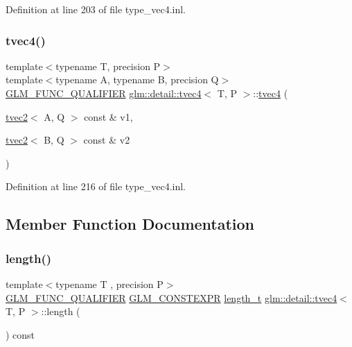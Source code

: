 Definition at line 203 of file type\+\_\+vec4.\+inl.

\mbox{\label{structglm_1_1detail_1_1tvec4_a5ae1182faaf5b3409da227032738f74a}} 
\subsubsection{\texorpdfstring{tvec4()}{tvec4()}\hspace{0.1cm}{\footnotesize\ttfamily [23/23]}}
{\footnotesize\ttfamily template$<$typename T, precision P$>$ \\
template$<$typename A, typename B, precision Q$>$ \\
\hyperlink{setup_8hpp_a33fdea6f91c5f834105f7415e2a64407}{G\+L\+M\+\_\+\+F\+U\+N\+C\+\_\+\+Q\+U\+A\+L\+I\+F\+I\+ER} \hyperlink{structglm_1_1detail_1_1tvec4}{glm\+::detail\+::tvec4}$<$ T, P $>$\+::\hyperlink{structglm_1_1detail_1_1tvec4}{tvec4} (\begin{DoxyParamCaption}\item[{\hyperlink{structglm_1_1detail_1_1tvec2}{tvec2}$<$ A, Q $>$ const \&}]{v1,  }\item[{\hyperlink{structglm_1_1detail_1_1tvec2}{tvec2}$<$ B, Q $>$ const \&}]{v2 }\end{DoxyParamCaption})}



Definition at line 216 of file type\+\_\+vec4.\+inl.



\subsection{Member Function Documentation}
\mbox{\label{structglm_1_1detail_1_1tvec4_a7a59e6b09b1a2262085cb30cb94eacfc}} 
\subsubsection{\texorpdfstring{length()}{length()}}
{\footnotesize\ttfamily template$<$typename T , precision P$>$ \\
\hyperlink{setup_8hpp_a33fdea6f91c5f834105f7415e2a64407}{G\+L\+M\+\_\+\+F\+U\+N\+C\+\_\+\+Q\+U\+A\+L\+I\+F\+I\+ER} \hyperlink{setup_8hpp_a08b807947b47031d3a511f03f89645ad}{G\+L\+M\+\_\+\+C\+O\+N\+S\+T\+E\+X\+PR} \hyperlink{namespaceglm_a090a0de2260835bee80e71a702492ed9}{length\+\_\+t} \hyperlink{structglm_1_1detail_1_1tvec4}{glm\+::detail\+::tvec4}$<$ T, P $>$\+::length (\begin{DoxyParamCaption}{ }\end{DoxyParamCaption}) const}



